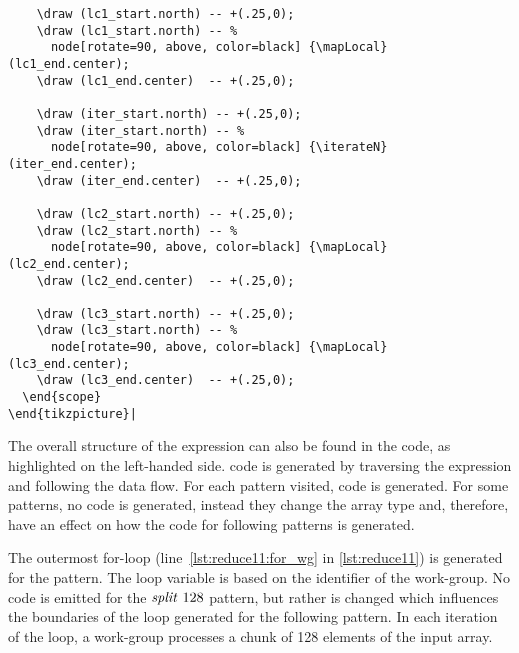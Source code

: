 \begin{lstlisting}
    \draw (lc1_start.north) -- +(.25,0);
    \draw (lc1_start.north) -- %
      node[rotate=90, above, color=black] {\mapLocal} (lc1_end.center);
    \draw (lc1_end.center)  -- +(.25,0);

    \draw (iter_start.north) -- +(.25,0);
    \draw (iter_start.north) -- %
      node[rotate=90, above, color=black] {\iterateN} (iter_end.center);
    \draw (iter_end.center)  -- +(.25,0);

    \draw (lc2_start.north) -- +(.25,0);
    \draw (lc2_start.north) -- %
      node[rotate=90, above, color=black] {\mapLocal} (lc2_end.center);
    \draw (lc2_end.center)  -- +(.25,0);

    \draw (lc3_start.north) -- +(.25,0);
    \draw (lc3_start.north) -- %
      node[rotate=90, above, color=black] {\mapLocal} (lc3_end.center);
    \draw (lc3_end.center)  -- +(.25,0);
  \end{scope}
\end{tikzpicture}|
\end{lstlisting}
%
The overall structure of the expression can also be found in the \OpenCL code, as highlighted on the left-handed side.
\OpenCL code is generated by traversing the expression and following the data flow.
For each pattern visited, \OpenCL code is generated.
For some patterns, no code is generated, instead they change the array type and, therefore, have an effect on how the code for following patterns is generated.

The outermost for-loop (line~\ref{lst:reduce11:for_wg} in \autoref{lst:reduce11}) is generated for the \mapWorkgroup pattern.
The loop variable  is based on the identifier of the work-group.
No code is emitted for the $\splitN\ 128$ pattern, but rather  is changed which influences the boundaries of the loop generated for the following \mapWorkgroup pattern. 
In each iteration of the loop, a work-group processes a chunk of 128 elements of the input array.

